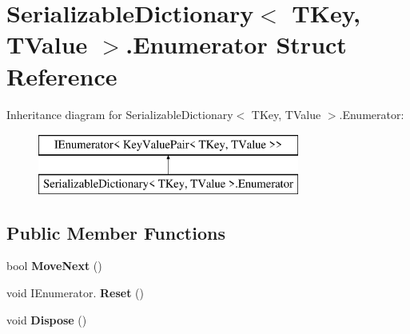 \hypertarget{struct_serializable_dictionary_1_1_enumerator}{}\section{Serializable\+Dictionary$<$ T\+Key, T\+Value $>$.Enumerator Struct Reference}
\label{struct_serializable_dictionary_1_1_enumerator}
Inheritance diagram for Serializable\+Dictionary$<$ T\+Key, T\+Value $>$.Enumerator\+:\begin{figure}[H]
\begin{center}
\leavevmode
\includegraphics[height=2.000000cm]{struct_serializable_dictionary_1_1_enumerator}
\end{center}
\end{figure}
\subsection*{Public Member Functions}
\begin{DoxyCompactItemize}
\item 
bool {\bfseries Move\+Next} ()\hypertarget{struct_serializable_dictionary_1_1_enumerator_adeff5b102851f5087c27e93bfdcf34f9}{}\label{struct_serializable_dictionary_1_1_enumerator_adeff5b102851f5087c27e93bfdcf34f9}

\item 
void I\+Enumerator. {\bfseries Reset} ()\hypertarget{struct_serializable_dictionary_1_1_enumerator_a5e3cbaeddd4f59dfe742e8b508a7015c}{}\label{struct_serializable_dictionary_1_1_enumerator_a5e3cbaeddd4f59dfe742e8b508a7015c}

\item 
void {\bfseries Dispose} ()\hypertarget{struct_serializable_dictionary_1_1_enumerator_a9f1fa2cf0f35497dbb07728923f4acd9}{}\label{struct_serializable_dictionary_1_1_enumerator_a9f1fa2cf0f35497dbb07728923f4acd9}

\end{DoxyCompactItemize}
